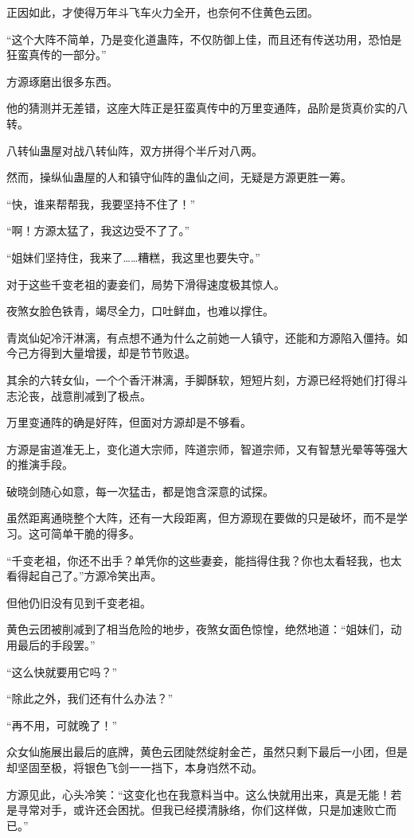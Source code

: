 \begin{this_body}
正因如此，才使得万年斗飞车火力全开，也奈何不住黄色云团。

“这个大阵不简单，乃是变化道蛊阵，不仅防御上佳，而且还有传送功用，恐怕是狂蛮真传的一部分。”

方源琢磨出很多东西。

他的猜测并无差错，这座大阵正是狂蛮真传中的万里变通阵，品阶是货真价实的八转。

八转仙蛊屋对战八转仙阵，双方拼得个半斤对八两。

然而，操纵仙蛊屋的人和镇守仙阵的蛊仙之间，无疑是方源更胜一筹。

“快，谁来帮帮我，我要坚持不住了！”

“啊！方源太猛了，我这边受不了了。”

“姐妹们坚持住，我来了……糟糕，我这里也要失守。”

对于这些千变老祖的妻妾们，局势下滑得速度极其惊人。

夜煞女脸色铁青，竭尽全力，口吐鲜血，也难以撑住。

青岚仙妃冷汗淋漓，有点想不通为什么之前她一人镇守，还能和方源陷入僵持。如今己方得到大量增援，却是节节败退。

其余的六转女仙，一个个香汗淋漓，手脚酥软，短短片刻，方源已经将她们打得斗志沦丧，战意削减到了极点。

万里变通阵的确是好阵，但面对方源却是不够看。

方源是宙道准无上，变化道大宗师，阵道宗师，智道宗师，又有智慧光晕等等强大的推演手段。

破晓剑随心如意，每一次猛击，都是饱含深意的试探。

虽然距离通晓整个大阵，还有一大段距离，但方源现在要做的只是破坏，而不是学习。这可简单干脆的得多。

“千变老祖，你还不出手？单凭你的这些妻妾，能挡得住我？你也太看轻我，也太看得起自己了。”方源冷笑出声。

但他仍旧没有见到千变老祖。

黄色云团被削减到了相当危险的地步，夜煞女面色惊惶，绝然地道：“姐妹们，动用最后的手段罢。”

“这么快就要用它吗？”

“除此之外，我们还有什么办法？”

“再不用，可就晚了！”

众女仙施展出最后的底牌，黄色云团陡然绽射金芒，虽然只剩下最后一小团，但是却坚固至极，将银色飞剑一一挡下，本身岿然不动。

方源见此，心头冷笑：“这变化也在我意料当中。这么快就用出来，真是无能！若是寻常对手，或许还会困扰。但我已经摸清脉络，你们这样做，只是加速败亡而已。”


\end{this_body}
